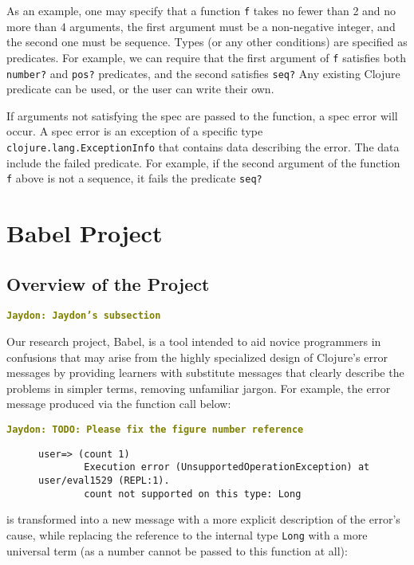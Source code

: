 \documentclass[12pt]{article}
\newcommand{\comment}[1]{{\bf \tt  {#1}}}
\newcommand{\jscomment}[1]{\textcolor{olive}{\comment{Jaydon: {#1}}}}
\begin{document}
As an example, one may specify that a function \texttt{f} takes no fewer than 2 and no more than 4 arguments, the first argument must be a non-negative integer, and the second one must be sequence. 
Types (or any other conditions) are specified as predicates. 
For example, we can require that the first argument of \texttt{f} satisfies both \texttt{number?} and \texttt{pos?} predicates, and the second satisfies \texttt{seq?}
Any existing Clojure predicate can be used, or the user can write their own. 

If arguments not satisfying the spec are passed to the function, a spec error will occur. 
A spec error is an exception of a specific type \texttt{clojure.lang.ExceptionInfo} that contains data describing the error. 
The data include the failed predicate.
For example, if the second argument of the function 
\texttt{f} above is not a sequence, it fails the predicate \texttt{seq?}

\section{Babel Project}\label{sec:babel}
\subsection{Overview of the Project}\label{subsec:overview}
\jscomment{Jaydon's subsection}

Our research project, Babel, is a tool intended to aid novice programmers in confusions that may arise from the highly specialized design of Clojure's error messages by providing learners with substitute messages that clearly describe the problems in simpler terms, removing unfamiliar jargon. For example, the error message produced via the function call below:

\jscomment{TODO: Please fix the figure number reference}

\begin{figure}[h]
	\centering
	\begin{lstlisting}[breaklines=true, basicstyle=\ttfamily]
        user=> (count 1)
        Execution error (UnsupportedOperationException) at user/eval1529 (REPL:1).
        count not supported on this type: Long
	\end{lstlisting}
\end{figure}

is transformed into a new message with a more explicit description of the error's cause, while replacing the reference to the internal type \verb|Long| with a more universal term (as a number cannot be passed to this function at all):
\end{document}
